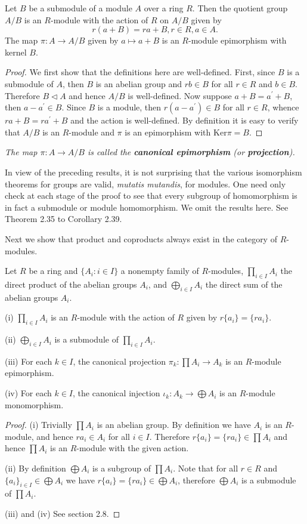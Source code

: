 \begin{theorem}
Let $B$ be a submodule of a module $A$ over a ring $R$. Then the quotient group $A/B$ is an $R$-module with the action of $R$ on $A/B$ given by 
$$
r\left( a+B \right) =ra+B,r\in R,a\in A.
$$
The map $\pi:A\to A/B$ given by $a\mapsto a+B$ is an $R$-module epimorphism with kernel $B$.
\end{theorem}
\begin{proof}
We first show that the definitions here are well-defined. First, since $B$ is a submodule of $A$, then $B$ is an abelian group and $rb\in B$ for all $r\in R$ and $b\in B$. Therefore $B\lhd A$ and hence $A/B$ is well-defined. Now suppose $a+B=a^\prime+B$, then $a-a^\prime\in B$. Since $B$ is a module, then $r(a-a^\prime)\in B$ for all $r\in R$, whence $ra+B=ra^\prime+B$ and the action is well-defined. By definition it is easy to verify that $A/B$ is an $R$-module and $\pi$ is an epimorphism with $\mathrm{Ker}\pi=B$.
\end{proof}
\begin{note}\em
The map $\pi:A\to A/B$ is called the \textbf{canonical epimorphism} (or \textbf{projection}).
\end{note}
In view of the preceding results, it is not surprising that the various isomorphism theorems for groups are valid, \textit{mutatis mutandis}, for modules. One need only check at each stage of the proof to see that every subgroup of homomorphism is in fact a submodule or module homomorphism. We omit the results here. See Theorem 2.35 to Corollary 2.39.\par
Next we show that product and coproducts always exist in the category of $R$-modules.
\begin{theorem}
Let $R$ be a ring and $\{A_i:i\in I\}$ a nonempty family of $R$-modules, $\prod_{i\in I}A_i$ the direct product of the abelian groups $A_i$, and $\bigoplus_{i\in I}A_i$ the direct sum of the abelian groups $A_i$.\par
(i) $\prod_{i\in I}A_i$ is an $R$-module with the action of $R$ given by $r\{a_i\}=\{ra_i\}$.\par
(ii) $\bigoplus_{i\in I}A_i$ is a submodule of $\prod_{i\in I}A_i$.\par
(iii) For each $k\in I$, the canonical projection $\pi_k:\prod A_i\to A_k$ is an $R$-module epimorphism.\par
(iv) For each $k\in I$, the canonical injection $\iota_k:A_k\to\bigoplus A_i$ is an $R$-module monomorphism.
\end{theorem}
\begin{proof}
(i) Trivially $\prod A_i$ is an abelian group. By definition we have $A_i$ is an $R$-module, and hence $ra_i\in A_i$ for all $i\in I$. Therefore $r\{a_i\}=\{ra_i\}\in\prod A_i$ and hence $\prod A_i$ is an $R$-module with the given action.\par
(ii) By definition $\bigoplus A_i$ is a subgroup of $\prod A_i$. Note that for all $r\in R$ and $\{a_i\}_{i\in I}\in\bigoplus A_i$ we have $r\{a_i\}=\{ra_i\}\in\bigoplus A_i$, therefore $\bigoplus A_i$ is a submodule of $\prod A_i$.\par
(iii) and (iv) See section 2.8.
\end{proof}
